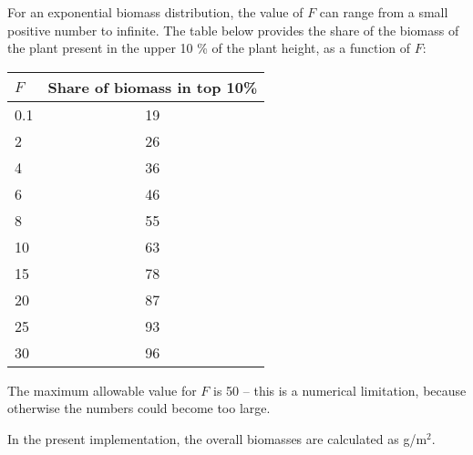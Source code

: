 For an exponential biomass distribution, the value of $F$ can range from a small positive number to
infinite. The table below provides the share of the biomass of the plant present in the upper 10 \% of the
plant height, as a function of $F$:

\begin{tabular}{lc}
\hline
$F$     &  Share of biomass in top 10\%  \\
\hline
0.1          &  19                            \\
2            &  26                            \\
4            &  36                            \\
6            &  46                            \\
8            &  55                            \\
10           &  63                            \\
15           &  78                            \\
20           &  87                            \\
25           &  93                            \\
30           &  96                            \\
\hline
\end{tabular}

The maximum allowable value for $F$ is 50 -- this is a numerical limitation, because otherwise the numbers could
become too large.

%


In the present implementation, the overall biomasses are calculated as g/m$^2$.

